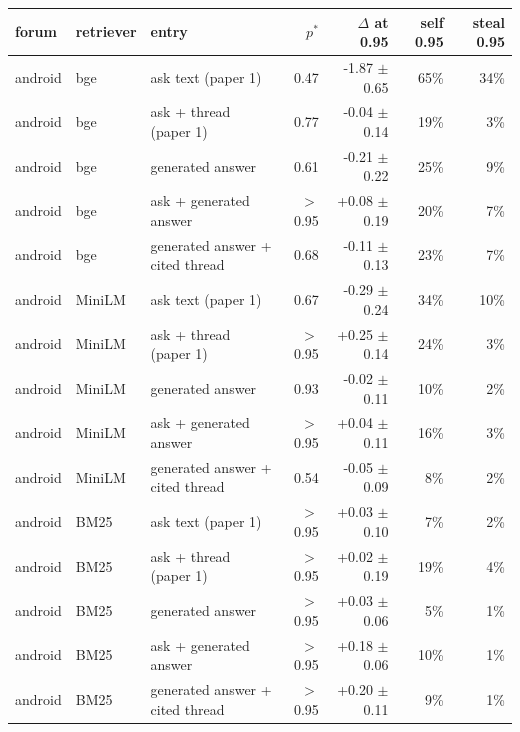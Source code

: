 \begin{tabular}{lllrrrr}
\toprule
forum & retriever & entry & $p^*$ & $\Delta$ at 0.95 & self 0.95 & steal 0.95 \\
\midrule
android & bge & ask text (paper 1) & 0.47 & -1.87 $\pm$ 0.65 & 65\% & 34\% \\
android & bge & ask + thread (paper 1) & 0.77 & -0.04 $\pm$ 0.14 & 19\% & 3\% \\
android & bge & generated answer & 0.61 & -0.21 $\pm$ 0.22 & 25\% & 9\% \\
android & bge & ask + generated answer & $>$0.95 & +0.08 $\pm$ 0.19 & 20\% & 7\% \\
android & bge & generated answer + cited thread & 0.68 & -0.11 $\pm$ 0.13 & 23\% & 7\% \\
\midrule
android & MiniLM & ask text (paper 1) & 0.67 & -0.29 $\pm$ 0.24 & 34\% & 10\% \\
android & MiniLM & ask + thread (paper 1) & $>$0.95 & +0.25 $\pm$ 0.14 & 24\% & 3\% \\
android & MiniLM & generated answer & 0.93 & -0.02 $\pm$ 0.11 & 10\% & 2\% \\
android & MiniLM & ask + generated answer & $>$0.95 & +0.04 $\pm$ 0.11 & 16\% & 3\% \\
android & MiniLM & generated answer + cited thread & 0.54 & -0.05 $\pm$ 0.09 & 8\% & 2\% \\
\midrule
android & BM25 & ask text (paper 1) & $>$0.95 & +0.03 $\pm$ 0.10 & 7\% & 2\% \\
android & BM25 & ask + thread (paper 1) & $>$0.95 & +0.02 $\pm$ 0.19 & 19\% & 4\% \\
android & BM25 & generated answer & $>$0.95 & +0.03 $\pm$ 0.06 & 5\% & 1\% \\
android & BM25 & ask + generated answer & $>$0.95 & +0.18 $\pm$ 0.06 & 10\% & 1\% \\
android & BM25 & generated answer + cited thread & $>$0.95 & +0.20 $\pm$ 0.11 & 9\% & 1\% \\
\bottomrule
\end{tabular}
